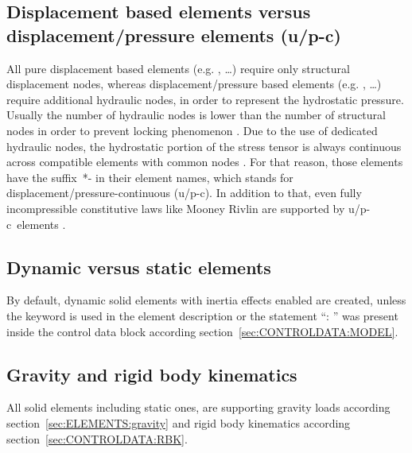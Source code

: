 \subsection{Displacement based elements versus displacement/pressure elements (u/p-c)}
All pure displacement based elements (e.g. , \ldots) require only structural displacement nodes,
whereas displacement/pressure based elements (e.g. , \ldots) require
additional hydraulic nodes, in order to represent the hydrostatic pressure.
Usually the number of hydraulic nodes is lower than the number of structural nodes in order to prevent
locking phenomenon \cite{BATHE2016}.
Due to the use of dedicated hydraulic nodes, the hydrostatic portion of the stress tensor is always continuous
across compatible elements with common nodes \cite{BATHE2016}. For that reason, those elements have the
suffix~*- in their element names, which stands for displacement/pressure-continuous (u/p-c).
In addition to that, even fully incompressible constitutive laws like Mooney Rivlin are supported
by u/p-c~elements \cite{BATHE2016}.

\subsection{Dynamic versus static elements}
By default, dynamic solid elements with inertia effects enabled are created,
unless the keyword  is used in the element description
or the statement ``: '' was present inside the control data block according section~\ref{sec:CONTROLDATA:MODEL}.
\subsection{Gravity and rigid body kinematics}
All solid elements including static ones, are supporting gravity loads according section~\ref{sec:ELEMENTS:gravity}
and rigid body kinematics according section~\ref{sec:CONTROLDATA:RBK}.
